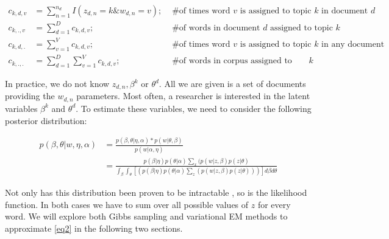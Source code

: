 \documentclass[12pt]{report}
\begin{document}
\begin{flushleft}
\begin{align*}
c_{k,d,v}&=\sum_{n=1}^{n_{d}}{I(z_{d,n}=k \& w_{d,n}=v)}; &\text{ \# of times word $v$ is assigned to topic $k$ in document $d$} \\
c_{k,.,v}&=\sum_{d=1}^{D}{c_{k,d,v}}; &\text{ \# of words in document $d$ assigned to topic $k$} \\
c_{k,d,.}&=\sum_{v=1}^{V}{c_{k,d,v}}; &\text{ \# of times word $v$ is assigned to topic $k$ in any document} \\
c_{k,.,.}&=\sum_{d=1}^{D}\sum_{v=1}^{V}{c_{k,d,v}}; &\text{ \# of words in corpus assigned to topic $k$} 
\end{align*}

In practice, we do not know $z_{d,n}, \beta^{k}$ or $\theta^{d}$. All we are given is a set of documents providing the $w_{d,n}$ parameters. Most often, a researcher is interested in the latent variables $\beta^{k}$ and $\theta^{d}$. To estimate these variables, we need to consider the following posterior distribution:

\begin{equation} \label{eq2}
\begin{align*} 
p(\beta, \theta | w, \eta, \alpha) &= \frac{p(\beta,\theta | \eta, \alpha) * p(w | \theta, \beta)}{p(w | \alpha, \eta) } \\&=\frac{p(\beta | \eta)p(\theta | \alpha)\sum_{x}{(p(w | z, \beta)p(z | \theta)}}{ \int_{\beta}\int_{\theta}{ \left[ (p(\beta | \eta)p(\theta | \alpha) \sum_{z}{(p(w | z, \beta)p(z |\theta) ) } ) \right] d\beta d\theta} }
\end{align*}
\end{equation}

Not only has this distribution been proven to be intractable \cite{lda}, so is the likelihood function. In both cases we have to sum over all possible values of $z$ for every word. We will explore both Gibbs sampling and variational EM methods to approximate \ref{eq2} in the following two sections. 


\end{flushleft}
\end{document}
